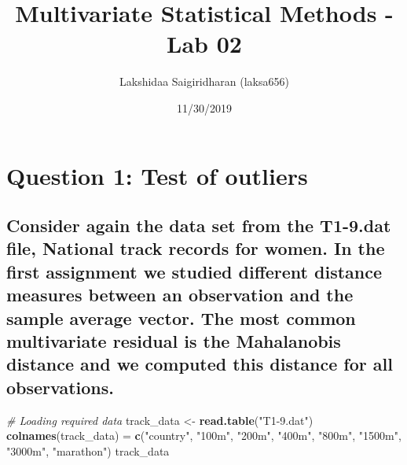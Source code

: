 \documentclass[]{article}
\title{Multivariate Statistical Methods - Lab 02}
\author{Lakshidaa Saigiridharan (laksa656)}
\date{11/30/2019}
\newenvironment{Shaded}{\begin{snugshade}}{\end{snugshade}}
\newcommand{\KeywordTok}[1]{\textcolor[rgb]{0.13,0.29,0.53}{\textbf{#1}}}
\newcommand{\StringTok}[1]{\textcolor[rgb]{0.31,0.60,0.02}{#1}}
\newcommand{\CommentTok}[1]{\textcolor[rgb]{0.56,0.35,0.01}{\textit{#1}}}
\newcommand{\NormalTok}[1]{#1}
\begin{document}
\maketitle

\section{Question 1: Test of
outliers}\label{question-1-test-of-outliers}

\subsection{Consider again the data set from the T1-9.dat file, National
track records for women. In the first assignment we studied different
distance measures between an observation and the sample average vector.
The most common multivariate residual is the Mahalanobis distance and we
computed this distance for all
observations.}\label{consider-again-the-data-set-from-the-t1-9.dat-file-national-track-records-for-women.-in-the-first-assignment-we-studied-different-distance-measures-between-an-observation-and-the-sample-average-vector.-the-most-common-multivariate-residual-is-the-mahalanobis-distance-and-we-computed-this-distance-for-all-observations.}

\begin{Shaded}
\begin{Highlighting}[]
\CommentTok{# Loading required data}
\NormalTok{track_data <-}\StringTok{ }\KeywordTok{read.table}\NormalTok{(}\StringTok{"T1-9.dat"}\NormalTok{)}
\KeywordTok{colnames}\NormalTok{(track_data) =}\StringTok{ }\KeywordTok{c}\NormalTok{(}\StringTok{"country"}\NormalTok{, }\StringTok{"100m"}\NormalTok{, }\StringTok{"200m"}\NormalTok{, }\StringTok{"400m"}\NormalTok{,}
                   \StringTok{"800m"}\NormalTok{, }\StringTok{"1500m"}\NormalTok{, }\StringTok{"3000m"}\NormalTok{, }\StringTok{"marathon"}\NormalTok{)}
\NormalTok{track_data}
\end{Highlighting}
\end{Shaded}
\end{document}
